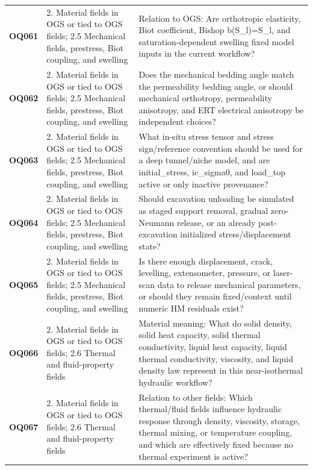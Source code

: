 \begin{longtable}{@{}L{0.10\textwidth} L{0.23\textwidth} L{0.59\textwidth}@{}}
\addlinespace[0.16em]
\textbf{OQ061} & 2. Material fields in OGS or tied to OGS fields; 2.5 Mechanical fields, prestress, Biot coupling, and swelling & Relation to OGS: Are orthotropic elasticity, Biot coefficient, Bishop b(S\_l)=S\_l, and saturation-dependent swelling fixed model inputs in the current workflow?\\
\addlinespace[0.16em]
\textbf{OQ062} & 2. Material fields in OGS or tied to OGS fields; 2.5 Mechanical fields, prestress, Biot coupling, and swelling & Does the mechanical bedding angle match the permeability bedding angle, or should mechanical orthotropy, permeability anisotropy, and ERT electrical anisotropy be independent choices?\\
\addlinespace[0.16em]
\textbf{OQ063} & 2. Material fields in OGS or tied to OGS fields; 2.5 Mechanical fields, prestress, Biot coupling, and swelling & What in-situ stress tensor and stress sign/reference convention should be used for a deep tunnel/niche model, and are initial\_stress, ic\_sigma0, and load\_top active or only inactive provenance?\\
\addlinespace[0.16em]
\textbf{OQ064} & 2. Material fields in OGS or tied to OGS fields; 2.5 Mechanical fields, prestress, Biot coupling, and swelling & Should excavation unloading be simulated as staged support removal, gradual zero-Neumann release, or an already post-excavation initialized stress/displacement state?\\
\addlinespace[0.16em]
\textbf{OQ065} & 2. Material fields in OGS or tied to OGS fields; 2.5 Mechanical fields, prestress, Biot coupling, and swelling & Is there enough displacement, crack, levelling, extensometer, pressure, or laser-scan data to release mechanical parameters, or should they remain fixed/context until numeric HM residuals exist?\\
\addlinespace[0.16em]
\textbf{OQ066} & 2. Material fields in OGS or tied to OGS fields; 2.6 Thermal and fluid-property fields & Material meaning: What do solid density, solid heat capacity, solid thermal conductivity, liquid heat capacity, liquid thermal conductivity, viscosity, and liquid density law represent in this near-isothermal hydraulic workflow?\\
\addlinespace[0.16em]
\textbf{OQ067} & 2. Material fields in OGS or tied to OGS fields; 2.6 Thermal and fluid-property fields & Relation to other fields: Which thermal/fluid fields influence hydraulic response through density, viscosity, storage, thermal mixing, or temperature coupling, and which are effectively fixed because no thermal experiment is active?\\

\end{longtable}
